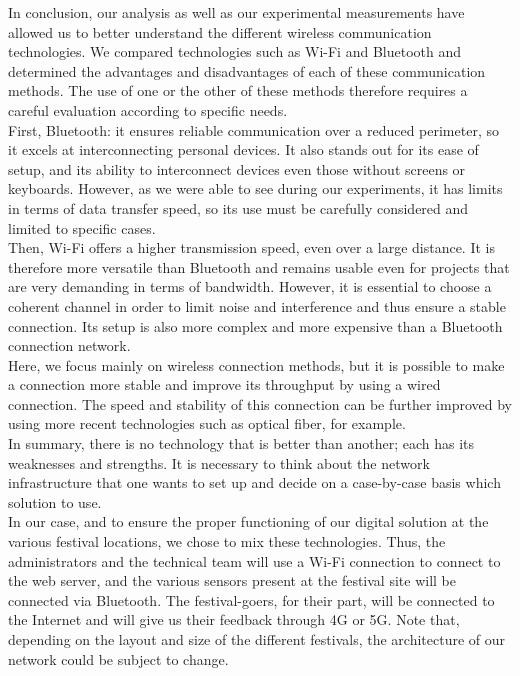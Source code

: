 \documentclass[12]{article}
\begin{document}
In conclusion, our analysis as well as our experimental measurements have allowed us to better understand the different wireless communication technologies. We compared technologies such as Wi-Fi and Bluetooth and determined the advantages and disadvantages of each of these communication methods. The use of one or the other of these methods therefore requires a careful evaluation according to specific needs.\\

First, Bluetooth: it ensures reliable communication over a reduced perimeter, so it excels at interconnecting personal devices. It also stands out for its ease of setup, and its ability to interconnect devices even those without screens or keyboards. However, as we were able to see during our experiments, it has limits in terms of data transfer speed, so its use must be carefully considered and limited to specific cases.\\

Then, Wi-Fi offers a higher transmission speed, even over a large distance. It is therefore more versatile than Bluetooth and remains usable even for projects that are very demanding in terms of bandwidth. However, it is essential to choose a coherent channel in order to limit noise and interference and thus ensure a stable connection. Its setup is also more complex and more expensive than a Bluetooth connection network.\\

Here, we focus mainly on wireless connection methods, but it is possible to make a connection more stable and improve its throughput by using a wired connection. The speed and stability of this connection can be further improved by using more recent technologies such as optical fiber, for example. \\

In summary, there is no technology that is better than another; each has its weaknesses and strengths. It is necessary to think about the network infrastructure that one wants to set up and decide on a case-by-case basis which solution to use.\\

In our case, and to ensure the proper functioning of our digital solution at the various festival locations, we chose to mix these technologies. Thus, the administrators and the technical team will use a Wi-Fi connection to connect to the web server, and the various sensors present at the festival site will be connected via Bluetooth. The festival-goers, for their part, will be connected to the Internet and will give us their feedback through 4G or 5G. Note that, depending on the layout and size of the different festivals, the architecture of our network could be subject to change.
\end{document}

